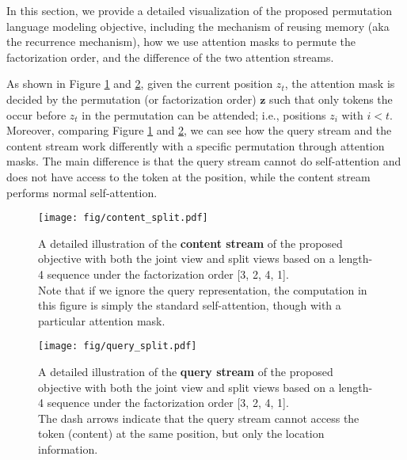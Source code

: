 \documentclass{article}
\begin{document}
In this section, we provide a detailed visualization of the proposed permutation language modeling objective, including the mechanism of reusing memory (aka the recurrence mechanism), how we use attention masks to permute the factorization order, and the difference of the two attention streams. 


As shown in Figure \ref{fig:vis_content} and \ref{fig:vis_query}, given the current position $z_t$, the attention mask is decided by the permutation (or factorization order) $\mathbf{z}$ such that only tokens the occur before $z_t$ in the permutation can be attended; i.e., positions $z_i$ with $i < t$. Moreover, comparing Figure \ref{fig:vis_content} and \ref{fig:vis_query}, we can see how the query stream and the content stream work differently with a specific permutation through attention masks. The main difference is that the query stream cannot do self-attention and does not have access to the token at the position, while the content stream performs normal self-attention.


\begin{figure}
	\centering
	\texttt{[image: fig/content\_split.pdf]}
	\caption{A detailed illustration of the \textbf{content stream} of the proposed objective with both the joint view and split views based on a length-4 sequence under the factorization order [3, 2, 4, 1].
		\\
		Note that if we ignore the query representation, the computation in this figure is simply the standard self-attention, though with a particular attention mask.}
	\label{fig:vis_content}
\end{figure}

\begin{figure}
	\centering
	\texttt{[image: fig/query\_split.pdf]}
	\caption{A detailed illustration of the \textbf{query stream} of the proposed objective with both the joint view and split views based on a length-4 sequence under the factorization order [3, 2, 4, 1].
		\\
		The dash arrows indicate that the query stream cannot access the token (content) at the same position, but only the location information.}
	\label{fig:vis_query}
\end{figure}
 
\end{document}
